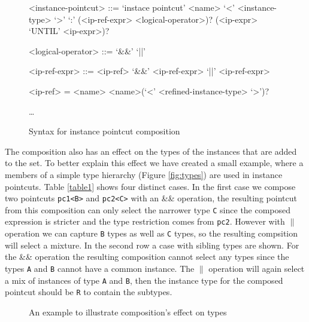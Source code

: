 \documentclass{llncs}
\begin{document}
\begin{figure}[h]
\begin{grammar}
<instance-pointcut> ::= `instace pointcut' <name> `<' <instance-type> `>' `:'
(<ip-ref-expr> <logical-operator>)? (<ip-expr> `UNTIL' <ip-expr>)? 

<logical-operator> ::= `&&' \alt `||'

<ip-ref-expr> ::= <ip-ref>  `&&' <ip-ref-expr>  `||' <ip-ref-expr>

<ip-ref> = <name> \alt <name>(`<' <refined-instance-type> `>')?

\ldots
\end{grammar}
\caption{Syntax for instance pointcut composition}
\label{fig:grammar2}
\end{figure}


The composition also has an effect on the types of the instances that are added to the set. To better explain this effect we have created a small example, where a members of a simple type hierarchy (Figure \ref{fig:types}) are used in instance pointcuts. Table \ref{table1} shows four distinct cases. In the first case we compose two pointcuts \texttt{pc1<B>} and \texttt{pc2<C>} with an \&\& operation, the resulting pointcut from this composition can only select the narrower type \texttt{C} since the composed expression is stricter and the type restriction comes from \texttt{pc2}. However with $\|$ operation we can capture \texttt{B} types as well as \texttt{C} types, so the resulting compsition will select a mixture. In the second row a case with sibling types are shown. For the \&\& operation the resulting composition cannot select any types since the types \texttt{A} and \texttt{B} cannot have a common instance. The $\|$ operation will again select a mix of instances of type \texttt{A} and \texttt{B}, then the instance type for the composed pointcut should be \texttt{R} to contain the subtypes.

\begin{figure}[h!]
\centering
{}
\hspace{20}
\caption{An example to illustrate composition's effect on types}
\label{fig:compotypes}
\end{figure}
\end{document}
